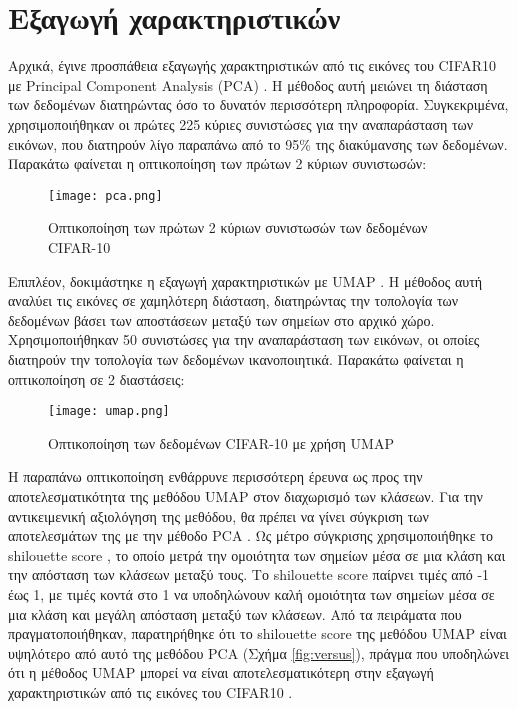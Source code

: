 \documentclass[a4paper,12pt]{article}
\newcommand{\lt}{\latintext}
\newcommand{\gt}{\greektext}
\begin{document}
\section{Εξαγωγή χαρακτηριστικών}
Αρχικά, έγινε προσπάθεια εξαγωγής χαρακτηριστικών από τις εικόνες του \lt CIFAR10 \gt με \lt Principal Component Analysis (PCA) \gt.
Η μέθοδος αυτή μειώνει τη διάσταση των δεδομένων διατηρώντας όσο το δυνατόν περισσότερη πληροφορία. 
Συγκεκριμένα, χρησιμοποιήθηκαν οι πρώτες 225 κύριες συνιστώσες για την αναπαράσταση των εικόνων, που διατηρούν λίγο παραπάνω από το 95\% της διακύμανσης
των δεδομένων. Παρακάτω φαίνεται η οπτικοποίηση των πρώτων 2 κύριων συνιστωσών:

\begin{figure}[H]
    \centering
    \texttt{[image: pca.png]}
    \caption{Οπτικοποίηση των πρώτων 2 κύριων συνιστωσών των δεδομένων \lt CIFAR-10 \gt}
    \label{fig:pca}
\end{figure}

Επιπλέον, δοκιμάστηκε η εξαγωγή χαρακτηριστικών με \lt UMAP \gt. 
Η μέθοδος αυτή αναλύει τις εικόνες σε χαμηλότερη διάσταση, διατηρώντας την τοπολογία των δεδομένων βάσει των αποστάσεων μεταξύ των 
σημείων στο αρχικό χώρο. Χρησιμοποιήθηκαν 50 συνιστώσες για την αναπαράσταση των εικόνων, οι οποίες διατηρούν την τοπολογία των δεδομένων 
ικανοποιητικά. Παρακάτω φαίνεται η οπτικοποίηση σε 2 διαστάσεις:

\begin{figure}[H]
    \centering
    \texttt{[image: umap.png]}
    \caption{Οπτικοποίηση των δεδομένων \lt CIFAR-10 \gt με χρήση \lt UMAP \gt}
    \label{fig:umap}
\end{figure}

Η παραπάνω οπτικοποίηση ενθάρρυνε περισσότερη έρευνα ως προς την αποτελεσματικότητα της μεθόδου \lt UMAP \gt στον διαχωρισμό των κλάσεων.
Για την αντικειμενική αξιολόγηση της μεθόδου, θα πρέπει να γίνει σύγκριση των αποτελεσμάτων της με την μέθοδο \lt PCA \gt. Ως μέτρο 
σύγκρισης χρησιμοποιήθηκε το \lt shilouette score \gt, το οποίο μετρά την ομοιότητα των σημείων μέσα σε μια κλάση και την απόσταση των 
κλάσεων μεταξύ τους. Το \lt shilouette score \gt παίρνει τιμές από -1 έως 1, με τιμές κοντά στο 1 να υποδηλώνουν καλή ομοιότητα των σημείων
μέσα σε μια κλάση και μεγάλη απόσταση μεταξύ των κλάσεων. Από τα πειράματα που πραγματοποιήθηκαν, παρατηρήθηκε ότι το \lt shilouette score \gt της μεθόδου \lt UMAP \gt
είναι υψηλότερο από αυτό της μεθόδου \lt PCA \gt (Σχήμα \ref{fig:versus}), πράγμα που υποδηλώνει ότι η μέθοδος \lt UMAP \gt μπορεί να είναι αποτελεσματικότερη 
στην εξαγωγή χαρακτηριστικών από τις εικόνες του \lt CIFAR10 \gt. 
\end{document}
